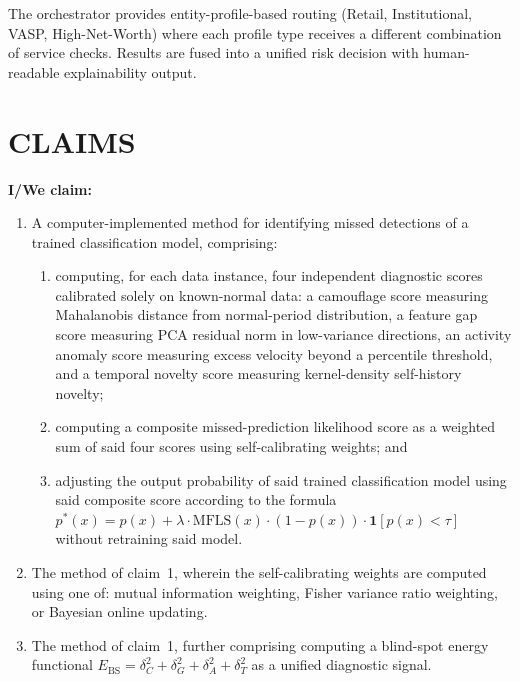 \documentclass[12pt,a4paper]{article}
\begin{document}
The orchestrator provides entity-profile-based routing (Retail, Institutional,
VASP, High-Net-Worth) where each profile type receives a different combination
of service checks.  Results are fused into a unified risk decision with
human-readable explainability output.

\newpage

\section*{CLAIMS}

\bigskip
\textbf{I/We claim:}

\bigskip

\begin{enumerate}[label=\textbf{\arabic*.}, leftmargin=2em]

\item A computer-implemented method for identifying missed detections of a
trained classification model, comprising:
\begin{enumerate}[label=(\alph*)]
  \item computing, for each data instance, four independent diagnostic scores
    calibrated solely on known-normal data: a camouflage score measuring
    Mahalanobis distance from normal-period distribution, a feature gap score
    measuring PCA residual norm in low-variance directions, an activity anomaly
    score measuring excess velocity beyond a percentile threshold, and a
    temporal novelty score measuring kernel-density self-history novelty;
  \item computing a composite missed-prediction likelihood score as a weighted
    sum of said four scores using self-calibrating weights; and
  \item adjusting the output probability of said trained classification model
    using said composite score according to the formula
    $p^*(x) = p(x) + \lambda \cdot \mathrm{MFLS}(x) \cdot (1-p(x)) \cdot
    \mathbf{1}[p(x) < \tau]$
    without retraining said model.
\end{enumerate}

\item The method of claim~1, wherein the self-calibrating weights are computed
using one of: mutual information weighting, Fisher variance ratio weighting, or
Bayesian online updating.

\item The method of claim~1, further comprising computing a blind-spot energy
functional $E_{\mathrm{BS}} = \delta_C^2 + \delta_G^2 + \delta_A^2 + \delta_T^2$
as a unified diagnostic signal.


\end{enumerate}
\end{document}
